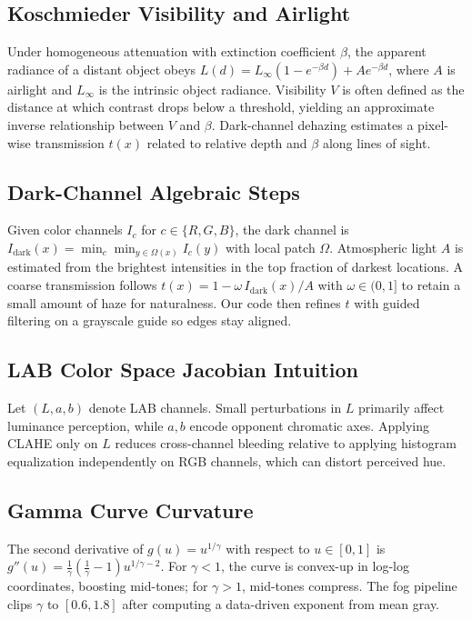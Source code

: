 \documentclass[10pt, conference]{IEEEtran}
\begin{document}
\subsection{Koschmieder Visibility and Airlight}
Under homogeneous attenuation with extinction coefficient $\beta$, the apparent radiance of a distant object obeys $L(d)=L_\infty (1-e^{-\beta d}) + A e^{-\beta d}$, where $A$ is airlight and $L_\infty$ is the intrinsic object radiance. Visibility $V$ is often defined as the distance at which contrast drops below a threshold, yielding an approximate inverse relationship between $V$ and $\beta$. Dark-channel dehazing estimates a pixel-wise transmission $t(x)$ related to relative depth and $\beta$ along lines of sight.

\subsection{Dark-Channel Algebraic Steps}
Given color channels $I_c$ for $c\in\{R,G,B\}$, the dark channel is $I_{\mathrm{dark}}(x)=\min_c \min_{y\in\Omega(x)} I_c(y)$ with local patch $\Omega$. Atmospheric light $A$ is estimated from the brightest intensities in the top fraction of darkest locations. A coarse transmission follows $t(x)=1-\omega\, I_{\mathrm{dark}}(x)/A$ with $\omega\in(0,1]$ to retain a small amount of haze for naturalness. Our code then refines $t$ with guided filtering on a grayscale guide so edges stay aligned.

\subsection{LAB Color Space Jacobian Intuition}
Let $(L,a,b)$ denote LAB channels. Small perturbations in $L$ primarily affect luminance perception, while $a,b$ encode opponent chromatic axes. Applying CLAHE only on $L$ reduces cross-channel bleeding relative to applying histogram equalization independently on RGB channels, which can distort perceived hue.

\subsection{Gamma Curve Curvature}
The second derivative of $g(u)=u^{1/\gamma}$ with respect to $u\in[0,1]$ is $g''(u)=\tfrac{1}{\gamma}(\tfrac{1}{\gamma}-1)u^{1/\gamma-2}$. For $\gamma<1$, the curve is convex-up in log-log coordinates, boosting mid-tones; for $\gamma>1$, mid-tones compress. The fog pipeline clips $\gamma$ to $[0.6,1.8]$ after computing a data-driven exponent from mean gray.
\end{document}
